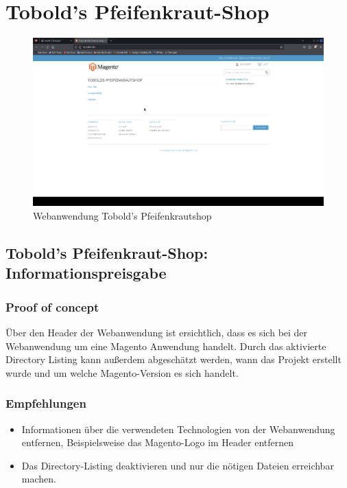 \chapter{Tobold's Pfeifenkraut-Shop}

\begin{figure}[!ht]
    \centering
    \includegraphics[width=\linewidth]{images/screenshots/09_pfeifenkraut_shop.png}
    \caption{Webanwendung Tobold's Pfeifenkrautshop}
    \label{fig:07_pfeifenkraut_shop}
\end{figure}
\newpage



\section{\makecvssbadge Tobold's Pfeifenkraut-Shop: Informationspreisgabe}

\subsection*{Proof of concept}
Über den Header der Webanwendung ist ersichtlich, dass es sich bei der Webanwendung um eine Magento Anwendung handelt. Durch das aktivierte Directory Listing kann außerdem abgeschätzt werden, wann das Projekt erstellt wurde und um welche Magento-Version es sich handelt.

\subsection*{Empfehlungen}
\begin{itemize}
    \item Informationen über die verwendeten Technologien von der Webanwendung entfernen, Beispielsweise das Magento-Logo im Header entfernen
    \item Das Directory-Listing deaktivieren und nur die nötigen Dateien erreichbar machen.
\end{itemize}

